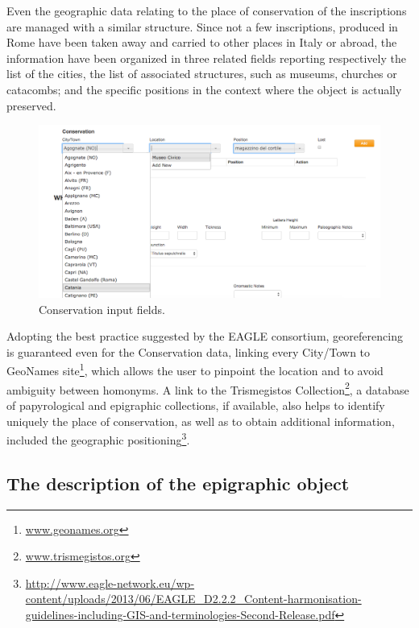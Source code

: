 \documentclass[amsthm,ebook]{saparticle}
\begin{document}
Even the geographic data relating to the place of conservation of the inscriptions are managed with a similar structure.
Since not a few inscriptions, produced in Rome have been taken away and carried to other places in Italy or abroad, the
information have been organized in three related fields reporting respectively the list of the cities, the list of
associated structures, such as museums, churches or catacombs; and the specific positions in the context where the
object is actually preserved.




\begin{figure}[hbp]
\centering
 \includegraphics[width=\columnwidth]{EAGLE2016Roccoengrev-img007.png}
\caption{Conservation input fields.}
\label{fig:7}
\end{figure}




Adopting the best practice suggested by the EAGLE consortium, georeferencing is guaranteed even for the Conservation
data, linking every City/Town to GeoNames site\footnote{ \url{www.geonames.org}}, which allows the user to pinpoint the
location and to avoid ambiguity between homonyms. A link to the Trismegistos Collection\footnote{
\url{www.trismegistos.org}}, a database of papyrological and epigraphic collections, if available, also helps to identify
uniquely the place of conservation, as well as to obtain additional information, included the geographic
positioning\footnote{\url{http://www.eagle-network.eu/wp-content/uploads/2013/06/EAGLE\_D2.2.2\_Content-harmonisation-guidelines-including-GIS-and-terminologies-Second-Release.pdf}}.




\subsection{The description of the epigraphic object }
\end{document}
